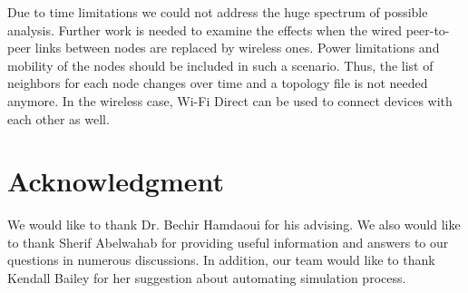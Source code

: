 \documentclass[12pt,journal]{IEEEtran}
\begin{document}
Due to time limitations we could not address the huge spectrum of possible analysis. Further work is needed to examine the effects when the wired peer-to-peer links between nodes are replaced by wireless ones. Power limitations and mobility of the nodes should be included in such a scenario. Thus, the list of neighbors for each node changes over time and a topology file is not needed anymore. In the wireless case, Wi-Fi Direct can be used to connect devices with each other as well.




%



\section*{Acknowledgment}
We would like to thank Dr. Bechir Hamdaoui for his advising. We also would like to thank Sherif Abelwahab for providing useful information and answers to our questions in numerous discussions. In addition, our team would like to thank Kendall Bailey for her suggestion about automating simulation process.



\ifCLASSOPTIONcaptionsoff
  \newpage
\fi
\end{document}
